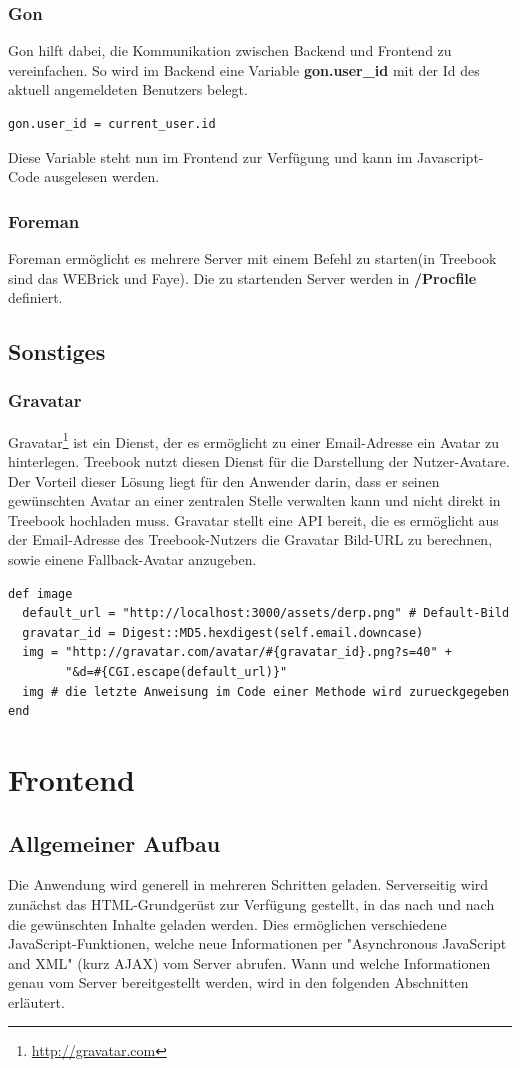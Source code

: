 \documentclass[10pt,a4paper]{book}
\begin{document}
\subsection{Gon}
Gon hilft dabei, die Kommunikation zwischen Backend und Frontend zu vereinfachen. So wird im Backend eine Variable \textbf{gon.user\_id} mit der Id des aktuell angemeldeten Benutzers belegt.
\begin{lstlisting}
gon.user_id = current_user.id
\end{lstlisting}
Diese Variable steht nun im Frontend zur Verfügung und kann im Javascript-Code ausgelesen werden.
\subsection{Foreman}
Foreman ermöglicht es mehrere Server mit einem Befehl zu starten(in Treebook sind das WEBrick und Faye). Die zu startenden Server werden in \textbf{/Procfile} definiert.
\section{Sonstiges}
\subsection{Gravatar}
Gravatar\footnote{\href{http://gravatar.com}{http://gravatar.com}} ist ein Dienst, der es ermöglicht zu einer Email-Adresse ein Avatar zu hinterlegen. Treebook nutzt diesen Dienst für die Darstellung der Nutzer-Avatare. Der Vorteil dieser Lösung liegt für den Anwender darin, dass er seinen gewünschten Avatar an einer zentralen Stelle verwalten kann und nicht direkt in Treebook hochladen muss. Gravatar stellt eine API bereit, die es ermöglicht aus der Email-Adresse des Treebook-Nutzers die Gravatar Bild-URL zu berechnen, sowie einene Fallback-Avatar anzugeben.
\begin{lstlisting}
def image
  default_url = "http://localhost:3000/assets/derp.png" # Default-Bild
  gravatar_id = Digest::MD5.hexdigest(self.email.downcase)
  img = "http://gravatar.com/avatar/#{gravatar_id}.png?s=40" +
        "&d=#{CGI.escape(default_url)}"
  img # die letzte Anweisung im Code einer Methode wird zurueckgegeben
end
\end{lstlisting}
\chapter{Frontend}
\section{Allgemeiner Aufbau}
Die Anwendung wird generell in mehreren Schritten geladen. Serverseitig wird zunächst das HTML-Grundgerüst zur Verfügung gestellt, in das nach und nach die gewünschten Inhalte geladen werden.
Dies ermöglichen verschiedene JavaScript-Funktionen, welche neue Informationen per "Asynchronous JavaScript and XML" (kurz AJAX) vom Server abrufen.
Wann und welche Informationen genau vom Server bereitgestellt werden, wird in den folgenden Abschnitten erläutert.
\end{document}
